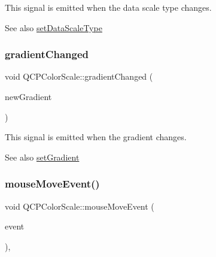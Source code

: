 This signal is emitted when the data scale type changes.

\begin{DoxySeeAlso}{See also}
\mbox{\hyperlink{class_q_c_p_color_scale_aeb6107d67dd7325145b2498abae67fc3}{set\+Data\+Scale\+Type}} 
\end{DoxySeeAlso}
\mbox{\label{class_q_c_p_color_scale_a67a5eb06cf551d322885e8635a46378c}} 
\subsubsection{\texorpdfstring{gradient\+Changed}{gradientChanged}}
{\footnotesize\ttfamily void Q\+C\+P\+Color\+Scale\+::gradient\+Changed (\begin{DoxyParamCaption}\item[{\mbox{\hyperlink{class_q_c_p_color_gradient}{Q\+C\+P\+Color\+Gradient}}}]{new\+Gradient }\end{DoxyParamCaption})\hspace{0.3cm}{\ttfamily [signal]}}

This signal is emitted when the gradient changes.

\begin{DoxySeeAlso}{See also}
\mbox{\hyperlink{class_q_c_p_color_scale_a1f29583bb6f1e7f473b62fb712be3940}{set\+Gradient}} 
\end{DoxySeeAlso}
\mbox{\label{class_q_c_p_color_scale_a3aca469d531ce7b5882de73590aa0de6}} 
\subsubsection{\texorpdfstring{mouse\+Move\+Event()}{mouseMoveEvent()}}
{\footnotesize\ttfamily void Q\+C\+P\+Color\+Scale\+::mouse\+Move\+Event (\begin{DoxyParamCaption}\item[{Q\+Mouse\+Event $\ast$}]{event }\end{DoxyParamCaption})\hspace{0.3cm}{\ttfamily [protected]}, {\ttfamily [virtual]}}

